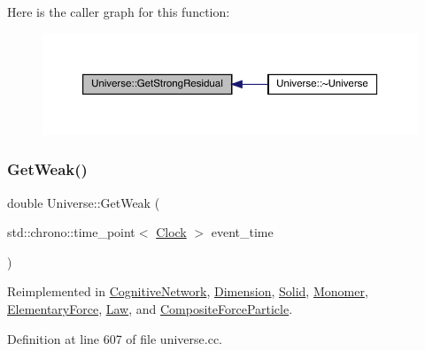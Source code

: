 Here is the caller graph for this function\+:
\nopagebreak
\begin{figure}[H]
\begin{center}
\leavevmode
\includegraphics[width=350pt]{class_universe_af0f4b81950061e63c2855eb40957a5b1_icgraph}
\end{center}
\end{figure}
\mbox{\label{class_universe_a4476b7e0a3fc1764909f556257fd9ec7}} 
\subsubsection{\texorpdfstring{Get\+Weak()}{GetWeak()}}
{\footnotesize\ttfamily double Universe\+::\+Get\+Weak (\begin{DoxyParamCaption}\item[{std\+::chrono\+::time\+\_\+point$<$ \hyperlink{universe_8h_a0ef8d951d1ca5ab3cfaf7ab4c7a6fd80}{Clock} $>$}]{event\+\_\+time }\end{DoxyParamCaption})\hspace{0.3cm}{\ttfamily [virtual]}}



Reimplemented in \hyperlink{class_cognitive_network_a761db75ac8eab7b4625e5a398891bd12}{Cognitive\+Network}, \hyperlink{class_dimension_a656ce92d07ea600cc0ec53865ad515e2}{Dimension}, \hyperlink{class_solid_ac8a7738735a6bda4e89414a2b0c370e1}{Solid}, \hyperlink{class_monomer_ac2070d7e39cd0b2a00aa6023ffd51f55}{Monomer}, \hyperlink{class_elementary_force_a4669f2ce414e508c70ae4ce0df503ad1}{Elementary\+Force}, \hyperlink{class_law_a303c365b7a17997a63a74756fc72fba3}{Law}, and \hyperlink{class_composite_force_particle_ab5cc0893a4063cc353ea5d2404f27b0b}{Composite\+Force\+Particle}.



Definition at line 607 of file universe.\+cc.


